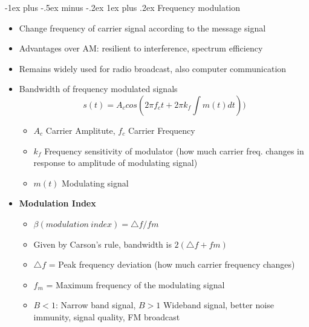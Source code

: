 \documentclass[10pt,landscape]{article}
\makeatletter
\newcommand{\subsubsubsection}{\@startsection{subsubsection}{3}{0mm}%
                                {-1ex plus -.5ex minus -.2ex}%
                                {1ex plus .2ex}%
                                {\normalfont\scriptsize\bfseries}}
\newcommand{\1}{\mathmybb{1}}
\makeatother
\begin{document}
\begin{multicols*}{3}
\subsubsubsection{Frequency modulation}
\begin{itemize}
  \item Change frequency of carrier signal according to the message signal
  \item Advantages over AM: resilient to interference, spectrum efficiency
  \item Remains widely used for radio broadcast, also computer communication
  \item Bandwidth of frequency modulated signals
      \[
        \boxed{s(t) = A_c cos (2\pi f_c t + 2\pi k_f \int m(t) dt))}
      \] 
    \begin{itemize}
      \item $A_c$ Carrier Amplitute, $f_c$ Carrier Frequency
      \item $k_f$ Frequency sensitivity of modulator (how much carrier freq. changes in response to amplitude of modulating signal)
      \item $m(t)$ Modulating signal
    \end{itemize}
  \item \textbf{Modulation Index}
  \begin{itemize}
    \item $\beta(modulation \ index) = \triangle f / fm$
    \item Given by Carson's rule, bandwidth is $2 (\triangle f + fm)$
    \item $\triangle f$ = Peak frequency deviation (how much carrier frequency changes)
    \item $f_m$ = Maximum frequency of the modulating signal
    \item $B < 1$: Narrow band signal, $B > 1$ Wideband signal, better noise immunity, signal quality, FM broadcast
  \end{itemize}
\end{itemize}


\end{multicols*}
\end{document}
